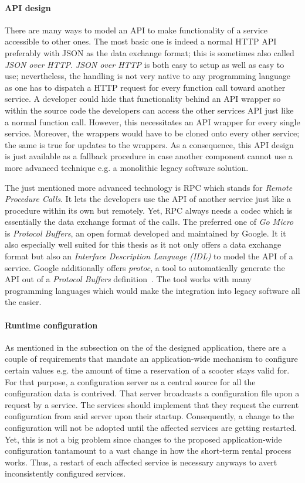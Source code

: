 \documentclass[12pt,a4paper,twoside]{report}
\begin{document}
\paragraph{API design} \label{construction-api_design}
There are many ways to model an API to make functionality of a service accessible
to other ones. The most basic one is indeed a normal HTTP API preferably with
JSON as the data exchange format; this is sometimes also called \textit{JSON over HTTP}.
\textit{JSON over HTTP} is both easy to setup as well as easy to use;
nevertheless, the handling is not very native to any programming language as one
has to dispatch a HTTP request for every function call toward another service.
A developer could hide that functionality behind an API wrapper so within the
source code the developers can access the other services API just like a normal
function call. However, this necessitates an API wrapper for every single service.
Moreover, the wrappers would have to be cloned onto every other service;
the same is true for updates to the wrappers.
As a consequence, this API design is just available as a fallback procedure
in case another component cannot use a more advanced technique e.g. a monolithic
legacy software solution.

The just mentioned more advanced technology is RPC which stands for
\textit{Remote Procedure Calls}.
It lets the developers use the API of another service just like a procedure within
its own but remotely. Yet, RPC always needs a codec which is essentially the
data exchange format of the calls. The preferred one of \textit{Go Micro}
is \textit{Protocol Buffers}, an open format developed and maintained by Google.
It it also especially well suited for this thesis as it not only offers a
data exchange format but also an \textit{Interface Description Language (IDL)}
to model the API of a service. Google additionally offers \textit{protoc},
a tool to automatically generate the API out of a \textit{Protocol Buffers}
definition~\cite{protobuf}. The tool works with many programming languages
which would make the integration into legacy software all the easier.

\paragraph{Runtime configuration}
As mentioned in the subsection on the \textit{}
of the designed application, there are a couple of requirements that
mandate an application-wide mechanism to configure certain values e.g.
the amount of time a reservation of a scooter stays valid for.
For that purpose, a configuration server as a central source for all the
configuration data is contrived. That server broadcasts a configuration file
upon a request by a service. The services should implement that they request
the current configuration from said server upon their startup. Consequently,
a change to the configuration will not be adopted until the affected services
are getting restarted. Yet, this is not a big problem since changes to the proposed
application-wide configuration tantamount to a vast change in how the
short-term rental process works. Thus, a restart of each affected service is
necessary anyways to avert inconsistently configured services.
\end{document}

